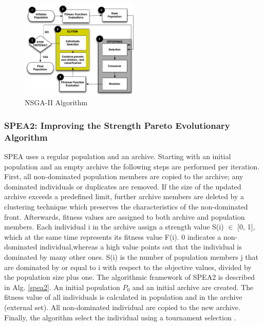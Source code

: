 \documentclass[espaco=umemeio,chapter=TITLE,twoside,openright]{abnt}
\begin{document}
\begin{figure}[h]
\centering
\includegraphics[width=0.5\textwidth]{./images/NSGA-2.png}
\caption{NSGA-II Algorithm}
\label{fig:nsga2}
\end{figure}

\subsubsection{SPEA2: Improving the Strength Pareto Evolutionary Algorithm}

SPEA uses a regular population and an archive. Starting with an initial population and an empty archive the following steps are performed per iteration. First, all non-dominated population members are copied to the archive; any dominated individuals or duplicates are removed. If the size of the updated archive exceeds a predefined limit, further archive members are deleted by a clustering technique which preserves the characteristics of the non-dominated front. Afterwards, fitness values are assigned to both archive and population members. Each individual i in the archive assign a strength value S(i) $\in$ [0, 1], which at the same time represents its fitness value F(i). 0 indicates a non-dominated individual,whereas a high value points out that the individual is dominated by many other ones. S(i) is the number of population members j that are dominated by or equal to i with respect to the objective values, divided by the population size plus one. The algorithmic framework of SPEA2 is described in Alg. \ref{spea2}. An initial population $P_{0}$ and an initial archive are created. The fitness value of all individuals is calculated in population and in the archive (external set). All non-dominated individual are copied to the new archive. Finally, the algorithm select the individual using a tournament selection \cite{Zitzler2001} \cite{Tervonen2017} \cite{MatneiFilho2016}.
\end{document}
